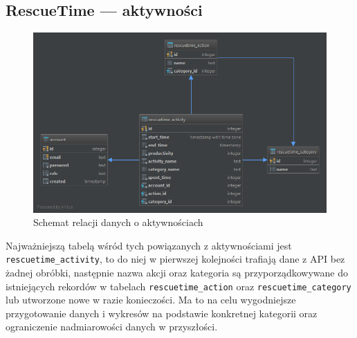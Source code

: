 \documentclass[brudnopis]{xmgr}
\begin{document}
    \subsection*{RescueTime --- aktywności}
    \begin{figure}
        \includegraphics[width=\linewidth]{fig/db-rescuetime-schema.png}
        \caption{Schemat relacji danych o aktywnościach}
        \label{fig:Dane z RescueTime --- Schemat relacji}
    \end{figure}

    Najważniejszą tabelą wśród tych powiązanych z aktywnościami jest \verb|rescuetime_activity|,
    to do niej w pierwszej kolejności trafiają dane z API bez żadnej obróbki,
    następnie nazwa akcji oraz kategoria są przyporządkowywane do istniejących rekordów w tabelach
    \verb|rescuetime_action| oraz \verb|rescuetime_category| lub utworzone nowe w razie konieczości.
    Ma to na celu wygodniejsze przygotowanie danych i wykresów na podstawie konkretnej kategorii
    oraz ograniczenie nadmiarowości danych w przyszłości.
\end{document}

